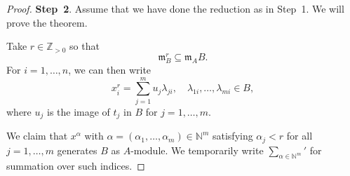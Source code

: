 \begin{proof}
    \textbf{Step~2}. Assume that we have done the reduction as in Step~1. We will prove the theorem.

    Take $r\in \mathbb{Z}_{>0}$ so that
    \[
        \mathfrak{m}_B^r\subseteq \mathfrak{m}_A B.  
    \]
    For $i=1,\ldots,n$, we can then write
    \begin{equation}\label{eq-xirexp}
        x_i^r=\sum_{j=1}^m u_j \lambda_{ji},\quad \lambda_{1i},\ldots,\lambda_{mi}\in B,
    \end{equation}
    where $u_j$ is the image of $t_j$ in $B$ for $j=1,\ldots,m$.

    We claim that $x^{\alpha}$ with $\alpha=(\alpha_1,\ldots,\alpha_m)\in \mathbb{N}^m$ satisfying $\alpha_j<r$ for all $j=1,\ldots,m$ generates $B$ as $A$-module. We temporarily write $\sum_{\alpha \in \mathbb{N}^m}'$ for summation over such indices.


\end{proof}

